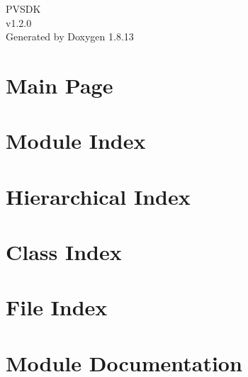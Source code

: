 \documentclass[twoside]{book}
\newcommand{\+}{\discretionary{\mbox{\scriptsize$\hookleftarrow$}}{}{}}
\newcommand{\clearemptydoublepage}{%
  \newpage{\pagestyle{empty}\cleardoublepage}%
}
\begin{document}
\hypersetup{pageanchor=false,
             bookmarksnumbered=true,
             pdfencoding=unicode
            }
\begin{titlepage}
\vspace*{7cm}
\begin{center}%
{\Large P\+V\+S\+DK \\[1ex]\large v1.\+2.\+0 }\\
\vspace*{1cm}
{\large Generated by Doxygen 1.8.13}\\
\end{center}
\end{titlepage}
\clearemptydoublepage
{}
\tableofcontents
\clearemptydoublepage
{}
\hypersetup{pageanchor=true}

\chapter{Main Page}
\label{index}\hypertarget{index}{}
\chapter{Module Index}

\chapter{Hierarchical Index}

\chapter{Class Index}

\chapter{File Index}

\chapter{Module Documentation}

\end{document}
